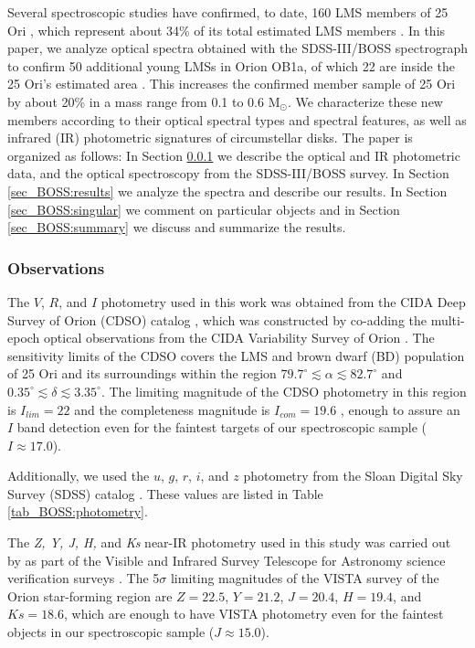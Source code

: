 \documentclass[12pt]{article}
\newcounter{subsubsubsection}[subsubsection]
\begin{document}
Several spectroscopic studies have confirmed, to date, 160 LMS members of 25 Ori \citep{Briceno2005,Briceno2007,Biazzo2011,Downes2014,Downes2015}, which represent about 34\% of its total estimated LMS members \citep{Downes2014}. In this paper, we analyze optical spectra obtained with the SDSS-III/BOSS spectrograph to confirm 50 additional young LMSs in Orion OB1a, of which 22 are inside the 25 Ori's estimated area \citep[$1^\circ$ radius; ][]{Briceno2005,Briceno2007}. This increases the confirmed member sample of 25 Ori by about 20\% in a mass range from 0.1 to 0.6 M$_\odot$. We characterize these new members according to their optical spectral types and spectral features, as well as infrared (IR) photometric signatures of circumstellar disks. The paper is organized as follows: In Section \ref{sec_BOSS:observations} we describe the optical and IR photometric data, and the optical spectroscopy from the SDSS-III/BOSS survey. In Section \ref{sec_BOSS:results} we analyze the spectra and describe our results. In Section \ref{sec_BOSS:singular} we comment on particular objects and in Section \ref{sec_BOSS:summary} we discuss and summarize the results.

\subsubsection{Observations}
\label{sec_BOSS:observations}

\label{sec_BOSS:Optphot}
The $V$, $R$, and $I$ photometry used in this work was obtained from the CIDA Deep Survey of Orion (CDSO) catalog \citep{Downes2014}, which was constructed by co-adding the multi-epoch optical observations from the CIDA Variability Survey of Orion \citep[CVSO; ][]{Briceno2005,Mateu2012}. The sensitivity limits of the CDSO covers the LMS and brown dwarf (BD) population of 25 Ori and its surroundings within the region $79.7^\circ\lesssim\alpha\lesssim82.7^\circ$ and $0.35^\circ\lesssim\delta\lesssim3.35^\circ$. The limiting magnitude of the CDSO photometry in this region is $I_{lim}=22$ and the completeness magnitude is $I_{com}=19.6$ \citep{Downes2014}, enough to assure an $I$ band detection even for the faintest targets of our spectroscopic sample ($I\approx17.0$).

Additionally, we used the $u$, $g$, $r$, $i$, and $z$ photometry from the Sloan Digital Sky Survey (SDSS) catalog \citep[][]{Finkbeiner2004,Ahn2012}. These values are listed in Table \ref{tab_BOSS:photometry}.

\label{sec_BOSS:IRphot}
The \textit{Z, Y, J, H,} and \textit{Ks} near-IR photometry used in this study was carried out by \citet{Petr-Gotzens2011} as part of the Visible and Infrared Survey Telescope for Astronomy \citep[VISTA; ][]{Emerson2004} science verification surveys \citep{Arnaboldi2010}. The 5$\sigma$ limiting magnitudes of the VISTA survey of the Orion star-forming region are $Z=22.5$, $Y=21.2$, $J=20.4$, $H=19.4$, and $Ks=18.6$, which are enough to have VISTA photometry even for the faintest objects in our spectroscopic sample ($J\approx15.0$).
\end{document}
